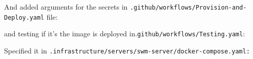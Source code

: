 
And added arguments for the secrets in \texttt{.github/workflows/Provision-and-Deploy.yaml} file:


and testing if it's the image is deployed in.\texttt{github/workflows/Testing.yaml}:


Specified it in \texttt{.infrastructure/servers/swm-server/docker-compose.yaml:}


